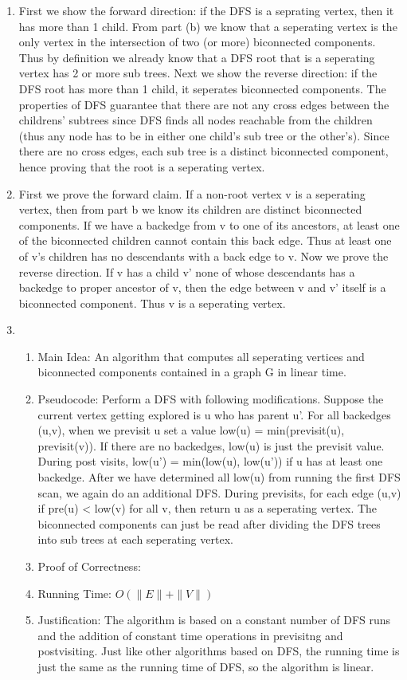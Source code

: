 \documentclass[11pt]{article}
\newenvironment{qparts}{\begin{enumerate}[{(}a{)}]}{\end{enumerate}}
\begin{document}
\begin{qparts}
If the components do not intersect, then it is clear that they have distinct vertices since they have distinct edges. Thus the vertex sets must either be disjoint or have 1 vertex in the intersection.
\item First we show the forward direction: if the DFS is a seprating vertex, then it has more than 1 child. From part (b) we know that a seperating vertex is the only vertex in the intersection of two (or more) biconnected components. Thus by definition we already know that a DFS root that is a seperating vertex has 2 or more sub trees. \newline
Next we show the reverse direction: if the DFS root has more than 1 child, it seperates biconnected components. The properties of DFS guarantee that there are not any cross edges between the childrens' subtrees since DFS finds all nodes reachable from the children (thus any node has to be in either one child's sub tree or the other's). Since there are no cross edges, each sub tree is a distinct biconnected component, hence proving that the root is a seperating vertex.
\item First we prove the forward claim. If a non-root vertex v is a seperating vertex, then from part b we know its children are distinct biconnected components. If we have a backedge from v to one of its ancestors, at least one of the biconnected children cannot contain this back edge. Thus at least one of v's children has no descendants with a back edge to v. Now we prove the reverse direction. If v has a child v' none of whose descendants has a backedge to proper ancestor of v, then the edge between v and v' itself is a biconnected component. Thus v is a seperating vertex.
\item
\begin{enumerate}
\item Main Idea: An algorithm that computes all seperating vertices and biconnected components contained in a graph G in linear time.
\item Pseudocode: Perform a DFS with following modifications. Suppose the current vertex getting explored is u who has parent u'. For all backedges (u,v), when we previsit u set a value low(u) = min(previsit(u), previsit(v)). If there are no backedges, low(u) is just the previsit value. During post visits, low(u') = min(low(u), low(u')) if u has at least one backedge. After we have determined all low(u) from running the first DFS scan, we again do an additional DFS. During previsits, for each edge (u,v) if pre(u) < low(v) for all v, then return u as a seperating vertex. The biconnected components can just be read after dividing the DFS trees into sub trees at each seperating vertex.
\item Proof of Correctness: 
\item Running Time: $O(\|E\|+\|V\|)$
\item Justification: The algorithm is based on a constant number of DFS runs and the addition of constant time operations in previsitng and postvisiting. Just like other algorithms based on DFS, the running time is just the same as the running time of DFS, so the algorithm is linear.
\end{enumerate} 

\end{qparts}
\end{document}
